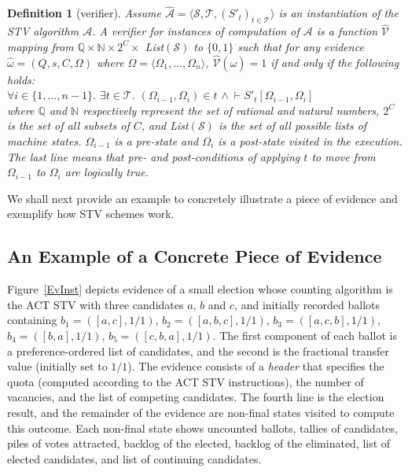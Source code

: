 \documentclass[10pt,conference]{IEEEtran}
\newtheorem{definition}{Definition}
\begin{document}
\begin{definition}[verifier]\label{verifier}
Assume $\hat{\mathcal{A}}= \langle \mathcal{S}, \mathcal{T}, (S'_t)_{t \in \mathcal{T}} \rangle$ is an instantiation of the STV algorithm $\mathcal{A}$. A verifier for instances of computation of $\mathcal{A}$ is a function $\hat{\mathcal{V}}$ mapping from $\mathbb{Q}\times\mathbb{N}\times 2^{C}\times$ \textsf{List}$(\mathcal{S})$ to $\{0,1\}$ such that for any evidence $\hat{\omega} = (Q,s,C,\Omega)$ where $\Omega=\langle\Omega_{1},\dots,\Omega_{n}\rangle$, $\hat{\mathcal{V}}(\hat{\omega}) = 1$ if and only if the following holds:\\
$\forall i\in\{1,\dots,n-1\}.$ 
$\exists t\in\mathcal{T}.$  $(\Omega_{i-1},\Omega_{i})\in t$ $\wedge~\vdash S'_{t}[\Omega_{i-1},\Omega_{i}]$\\ 
where $\mathbb{Q}$ and $\mathbb{N}$ respectively represent the set of rational and natural numbers, $2^{C}$ is the set of all subsets of $C$, and \textsf{List}$(\mathcal{S})$ is the set of all possible lists of machine states. $\Omega_{i-1}$ is a pre-state and $\Omega_{i}$ is a post-state visited in the execution. The last line means that pre- and post-conditions  of applying $t$ to move from $\Omega_{i-1}$ to $\Omega_{i}$  are logically true. 
\end{definition} 
We shall next provide an example to concretely illustrate a piece of evidence and exemplify how STV schemes work. 
 \subsection{An Example of a Concrete Piece of Evidence}
\label{subsec:InstEv}
Figure~\ref{EvInst} depicts evidence of a small election whose counting algorithm is the ACT STV 
with three candidates $a$, $b$ and $c$, and initially recorded ballots containing
$b_1=([a,c],1/1)$, $b_2=([a,b,c],1/1)$, $b_3=([a,c,b],1/1)$,
$b_4=([b,a],1/1)$, $b_5=([c,b,a],1/1)$.  The first component of each ballot is a preference-ordered list of candidates, and the second is the fractional transfer value (initially set to $1/1$). The evidence consists of a \emph{header} that specifies the quota (computed according to the ACT STV instructions), the number of vacancies, and the list of competing candidates. 
The fourth line is the election result, and the remainder of the evidence are non-final states visited to compute this
outcome. Each non-final state shows uncounted ballots, tallies of candidates, piles of votes attracted, backlog of the elected, backlog of the eliminated, list of elected candidates, and list of continuing candidates. 
\end{document}
